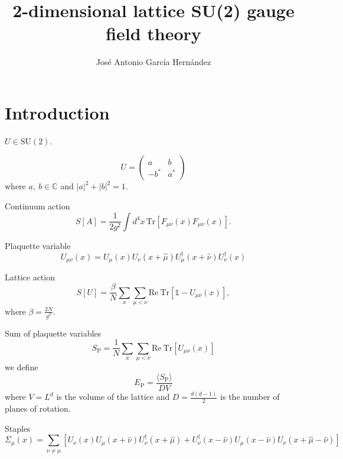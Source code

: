 \documentclass[12pt,a4paper]{article}
\author{José Antonio García Hernández}
\title{2-dimensional lattice SU(2) gauge field theory}
\begin{document}
\maketitle
\section{Introduction}
$U \in \text{SU}(2)$.

\begin{equation}
	\label{eq:SU2_element}
	U = \begin{pmatrix}
		a & b \\
		-b^* & a^*
	\end{pmatrix}
\end{equation}
where $a, \ b \in \mathbb{C}$ and $|a|^2 + |b|^2 = 1$.


Continuum action
\begin{equation}
	\label{eq:continuum_action}
	S[A] = \frac{1}{2g^2} \int d^4x \, \text{Tr} \left[ F_{\mu\nu}(x)F_{\mu\nu}(x)\right].
\end{equation} 

Plaquette variable
\begin{equation}
	\label{eq:plaquette}
	U_{\mu\nu}(x) = U_{\mu}(x)U_{\nu}(x+\hat{\mu})U_{\mu}^{\dagger}(x+\hat{\nu})U_{\nu}^{\dagger}(x) 
\end{equation}


Lattice action
\begin{equation}
	\label{eq:wilson_action}
	S[U] = \frac{\beta}{N}\sum_x \sum_{\mu < \nu} \text{Re}\ \text{Tr} \left[\mathds{1} - U_{\mu\nu}(x) \right],
\end{equation}
where $\beta = \frac{2N}{g^2}$.

Sum of plaquette variables
\begin{equation}
	\label{eq:Sp}
	S_{\text{P}} = \frac{1}{N} \sum_x\sum_{\mu < \nu} \text{Re}\ \text{Tr} [U_{\mu\nu}(x)]
\end{equation}
we define
\begin{equation}
	\label{eq:Ep}
	E_{\text{P}} =\frac{ \langle S_{\text{P}} \rangle}{D V}
\end{equation}
where $V=L^d$ is the volume of the lattice and $D = \frac{d(d-1)}{2}$ is the number of planes of rotation.

Staples
\begin{equation}
	\label{eq:staples}
	\Sigma_{\mu}(x) = \sum_{\nu \neq \mu} \left[ U_{\nu}(x)U_{\mu}(x+\hat{\nu})U_{\nu}^{\dagger}(x+\hat{\mu}) + U_{\nu}^{\dagger}(x-\hat{\nu})U_{\mu}(x-\hat{\nu})U_{\nu}(x+\hat{\mu}-\hat{\nu})\right]
\end{equation}
\end{document}
